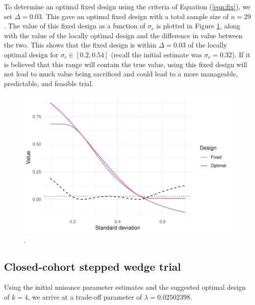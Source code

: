 \documentclass[sagev, Crown]{sagej}
\begin{document}
To determine an optimal fixed design using the criteria of Equation (\ref{eqn:fix}), we set $\Delta = 0.03$. This gave an optimal fixed design with a total sample size of $n = 29$. The value of this fixed design as a function of $\sigma_c$ is plotted in Figure \ref{fig:fixed_t_test}, along with the value of the locally optimal design and the difference in value between the two. This shows that the fixed design is within $\Delta = 0.03$ of the locally optimal design for $\sigma_c \in [0.2, 0.54]$ (recall the initial estimate was $\sigma_c = 0.32$). If it is believed that this range will contain the true value, using this fixed design will not lead to much value being sacrificed and could lead to a more manageable, predictable, and feasible trial.

\begin{figure}
\centering
\includegraphics[scale=0.8]{./figures/fixed_t_test}
\caption{.}
\label{fig:fixed_t_test}
\end{figure}

\subsection{Closed-cohort stepped wedge trial}

Using the initial nuisance parameter estimates and the suggested optimal design of $k = 4$, we arrive at a trade-off parameter of $\lambda = 0.02502398$.
\end{document}
